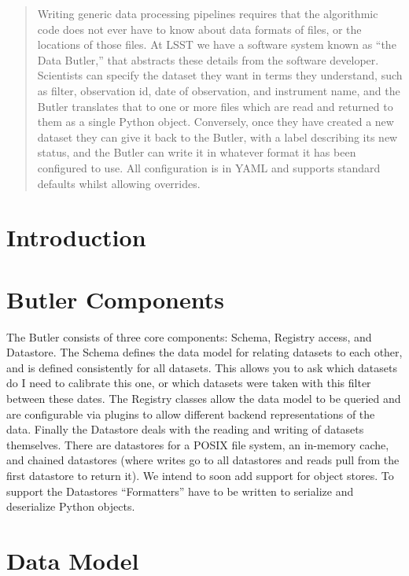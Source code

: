 \documentclass[11pt,twoside]{article}
\begin{document}
\begin{abstract}
  Writing generic data processing pipelines requires that the algorithmic code does not ever have to know about data formats of files, or the locations of those files.
  At LSST we have a software system known as ``the Data Butler,'' that abstracts these details from the software developer.
  Scientists can specify the dataset they want in terms they understand, such as filter, observation id, date of observation, and instrument name, and the Butler translates that to one or more files which are read and returned to them as a single Python object.
  Conversely, once they have created a new dataset they can give it back to the Butler, with a label describing its new status, and the Butler can write it in whatever format it has been configured to use.
  All configuration is in YAML and supports standard defaults whilst allowing overrides.
\end{abstract}

\section{Introduction}

\section{Butler Components}

The Butler consists of  three core components: Schema, Registry access, and Datastore.
The Schema defines the data model for relating datasets to each other, and is defined consistently for all datasets.
This allows you to ask which datasets do I need to calibrate this one, or which datasets were taken with this filter between these dates.
The Registry classes allow the data model to be queried and are configurable via plugins to allow different backend representations of the data.
Finally the Datastore deals with the reading and writing of datasets themselves.
There are datastores for a POSIX file system, an in-memory cache, and chained datastores (where writes go to all datastores and reads pull from the first datastore to return it).
We intend to soon add support for object stores.
To support the Datastores ``Formatters'' have to be written to serialize and deserialize Python objects.


\section{Data Model}
\end{document}
